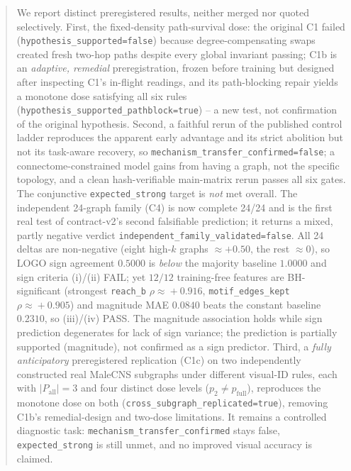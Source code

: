 \documentclass[10pt,twocolumn,letterpaper]{article}
\begin{document}
\begin{abstract}
We report distinct preregistered results, neither merged nor quoted
selectively. First, the fixed-density path-survival dose: the original C1
failed (\texttt{hypothesis\_supported=false}) because degree-compensating
swaps created fresh two-hop paths despite every global invariant passing; C1b
is an \emph{adaptive, remedial} preregistration, frozen before training but
designed after inspecting C1's in-flight readings, and its path-blocking
repair yields a monotone dose satisfying all six rules
(\texttt{hypothesis\_supported\_pathblock=true}) -- a new test, not
confirmation of the original hypothesis. Second, a faithful rerun of the
published control ladder reproduces the apparent early advantage and its
strict abolition but not its task-aware recovery, so
\texttt{mechanism\_transfer\_confirmed=false}; a connectome-constrained model
gains from having a graph, not the specific topology, and a clean
hash-verifiable main-matrix rerun passes all six gates. The conjunctive
\texttt{expected\_strong} target is \emph{not} met overall. The independent
24-graph family (C4) is now complete 24/24 and is the first real test of
contract-v2's second falsifiable prediction; it returns a mixed, partly
negative verdict \texttt{independent\_family\_validated=false}. All 24 deltas
are non-negative (eight high-$k$ graphs $\approx+0.50$, the rest $\approx0$),
so LOGO sign agreement $0.5000$ is \emph{below} the majority baseline $1.0000$
and sign criteria (i)/(ii) FAIL; yet $12/12$ training-free features are
BH-significant (strongest \texttt{reach\_b} $\rho\!\approx\!+0.916$,
\texttt{motif\_edges\_kept} $\rho\!\approx\!+0.905$) and magnitude MAE
$0.0840$ beats the constant baseline $0.2310$, so (iii)/(iv) PASS. The
magnitude association holds while sign prediction degenerates for lack of
sign variance; the prediction is partially supported (magnitude), not
confirmed as a sign predictor. Third, a \emph{fully anticipatory} preregistered replication (C1c) on two
independently constructed real MaleCNS subgraphs under different visual-ID
rules, each with $|P_{\mathrm{all}}|=3$ and four distinct dose levels
($p_2\!\neq\!p_{\mathrm{full}}$), reproduces the monotone dose on both
(\texttt{cross\_subgraph\_replicated=true}), removing C1b's remedial-design
and two-dose limitations. It remains a controlled diagnostic task:
\texttt{mechanism\_transfer\_confirmed} stays false,
\texttt{expected\_strong} is still unmet, and no improved visual accuracy is
claimed.
\end{abstract}









\end{document}

